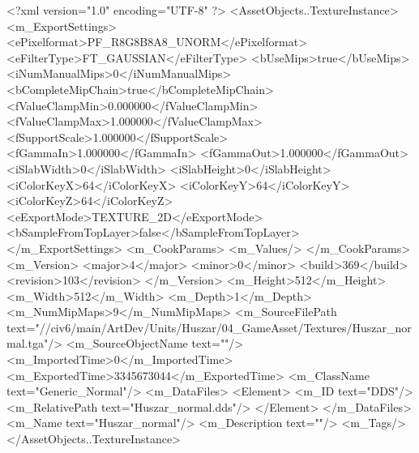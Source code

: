 <?xml version="1.0" encoding="UTF-8" ?>
<AssetObjects..TextureInstance>
	<m_ExportSettings>
		<ePixelformat>PF_R8G8B8A8_UNORM</ePixelformat>
		<eFilterType>FT_GAUSSIAN</eFilterType>
		<bUseMips>true</bUseMips>
		<iNumManualMips>0</iNumManualMips>
		<bCompleteMipChain>true</bCompleteMipChain>
		<fValueClampMin>0.000000</fValueClampMin>
		<fValueClampMax>1.000000</fValueClampMax>
		<fSupportScale>1.000000</fSupportScale>
		<fGammaIn>1.000000</fGammaIn>
		<fGammaOut>1.000000</fGammaOut>
		<iSlabWidth>0</iSlabWidth>
		<iSlabHeight>0</iSlabHeight>
		<iColorKeyX>64</iColorKeyX>
		<iColorKeyY>64</iColorKeyY>
		<iColorKeyZ>64</iColorKeyZ>
		<eExportMode>TEXTURE_2D</eExportMode>
		<bSampleFromTopLayer>false</bSampleFromTopLayer>
	</m_ExportSettings>
	<m_CookParams>
		<m_Values/>
	</m_CookParams>
	<m_Version>
		<major>4</major>
		<minor>0</minor>
		<build>369</build>
		<revision>103</revision>
	</m_Version>
	<m_Height>512</m_Height>
	<m_Width>512</m_Width>
	<m_Depth>1</m_Depth>
	<m_NumMipMaps>9</m_NumMipMaps>
	<m_SourceFilePath text="//civ6/main/ArtDev/Units/Huszar/04_GameAsset/Textures/Huszar_normal.tga"/>
	<m_SourceObjectName text=""/>
	<m_ImportedTime>0</m_ImportedTime>
	<m_ExportedTime>3345673044</m_ExportedTime>
	<m_ClassName text="Generic_Normal"/>
	<m_DataFiles>
		<Element>
			<m_ID text="DDS"/>
			<m_RelativePath text="Huszar_normal.dds"/>
		</Element>
	</m_DataFiles>
	<m_Name text="Huszar_normal"/>
	<m_Description text=""/>
	<m_Tags/>
</AssetObjects..TextureInstance>


